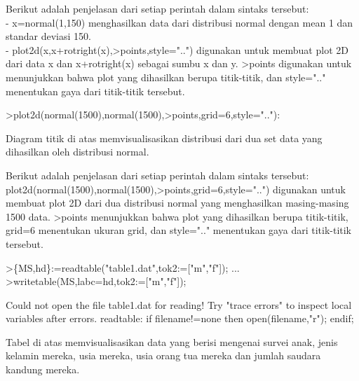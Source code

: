 \documentclass[a4paper,10pt]{article}
\begin{document}
\begin{eulernotebook}
\begin{eulercomment}
\begin{eulercomment}
\begin{eulercomment}
\begin{eulercomment}
\begin{eulercomment}
\begin{eulercomment}
\begin{eulercomment}
\begin{eulercomment}
\begin{eulercomment}
\begin{eulercomment}
\begin{eulercomment}
\begin{eulercomment}
\begin{eulercomment}
\begin{eulercomment}
\begin{eulercomment}
\begin{eulercomment}
\begin{eulercomment}
\begin{eulercomment}
\begin{eulercomment}
Berikut adalah penjelasan dari setiap perintah dalam sintaks tersebut:\\
- x=normal(1,150) menghasilkan data dari distribusi normal dengan mean
1 dan standar deviasi 150.\\
- plot2d(x,x+rotright(x),\textgreater{}points,style="..") digunakan untuk membuat
plot 2D dari data x dan x+rotright(x) sebagai sumbu x dan y. \textgreater{}points
digunakan untuk menunjukkan bahwa plot yang dihasilkan berupa
titik-titik, dan style=".." menentukan gaya dari titik-titik tersebut.
\end{eulercomment}
\begin{eulerprompt}
>plot2d(normal(1500),normal(1500),>points,grid=6,style=".."):
\end{eulerprompt}
\begin{eulercomment}
Diagram titik di atas memvisualisasikan distribusi dari dua set data
yang dihasilkan oleh distribusi normal.

Berikut adalah penjelasan dari setiap perintah dalam sintaks tersebut:\\
plot2d(normal(1500),normal(1500),\textgreater{}points,grid=6,style="..") digunakan
untuk membuat plot 2D dari dua distribusi normal yang menghasilkan
masing-masing 1500 data. \textgreater{}points menunjukkan bahwa plot yang
dihasilkan berupa titik-titik, grid=6 menentukan ukuran grid, dan
style=".." menentukan gaya dari titik-titik tersebut.
\end{eulercomment}
\begin{eulerprompt}
>\{MS,hd\}:=readtable("table1.dat",tok2:=["m","f"]); ...
>writetable(MS,labc=hd,tok2:=["m","f"]);
\end{eulerprompt}
\begin{euleroutput}
  Could not open the file
  table1.dat
  for reading!
  Try "trace errors" to inspect local variables after errors.
  readtable:
      if filename!=none then open(filename,"r"); endif;
\end{euleroutput}
\begin{eulercomment}
Tabel di atas memvisualisasikan data yang berisi mengenai survei anak,
jenis kelamin mereka, usia mereka, usia orang tua mereka dan jumlah
saudara kandung mereka.


\end{eulercomment}
\end{eulercomment}
\end{eulercomment}
\end{eulercomment}
\end{eulercomment}
\end{eulercomment}
\end{eulercomment}
\end{eulercomment}
\end{eulercomment}
\end{eulercomment}
\end{eulercomment}
\end{eulercomment}
\end{eulercomment}
\end{eulercomment}
\end{eulercomment}
\end{eulercomment}
\end{eulercomment}
\end{eulercomment}
\end{eulercomment}
\end{eulernotebook}
\end{document}
